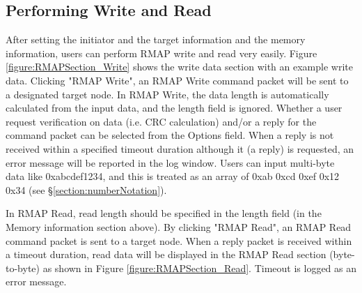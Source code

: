 \documentclass[a4paper,10pt]{article}
\begin{document}
\subsection{Performing Write and Read}
After setting the initiator and the target information and the memory information, users can perform RMAP write and read very easily. Figure \ref{figure:RMAPSection_Write} shows the write data section with an example write data. Clicking "RMAP Write", an RMAP Write command packet will be sent to a designated target node. In RMAP Write, the data length is automatically calculated from the input data, and the length field is ignored. Whether a user request verification on data (i.e. CRC calculation) and/or a reply for the command packet can be selected from the Options field. When a reply is not received within a specified timeout duration although it (a reply) is requested, an error message will be reported in the log window. Users can input multi-byte data like 0xabcdef1234, and this is treated as an array of 0xab 0xcd 0xef 0x12 0x34 (see \S\ref{section:numberNotation}).

In RMAP Read, read length should be specified in the length field (in the Memory information section above). By clicking "RMAP Read", an RMAP Read command packet is sent to a target node. When a reply packet is received within a timeout duration, read data will be displayed in the RMAP Read section (byte-to-byte) as shown in Figure \ref{figure:RMAPSection_Read}. Timeout is logged as an error message.
\end{document}
